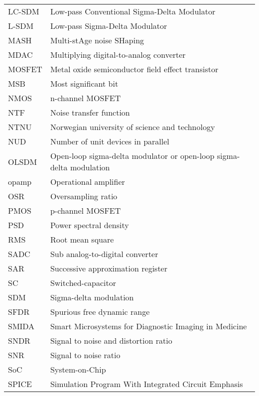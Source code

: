 \begin{tabular}{l l}
LC-SDM & Low-pass Conventional Sigma-Delta Modulator\\
L-SDM & Low-pass  Sigma-Delta Modulator\\
MASH & Multi-stAge noise SHaping\\
MDAC & Multiplying digital-to-analog converter\\
MOSFET & Metal oxide semiconductor field effect transistor\\
MSB & Most significant bit\\
NMOS & n-channel MOSFET\\
NTF & Noise transfer function\\
NTNU & Norwegian university of science and technology\\
NUD & Number of unit devices in parallel\\
OLSDM & Open-loop sigma-delta modulator or open-loop sigma-delta modulation \\
opamp & Operational amplifier\\
OSR & Oversampling ratio\\
PMOS & p-channel MOSFET\\
PSD & Power spectral density\\
RMS & Root mean square\\
SADC & Sub analog-to-digital converter\\
SAR & Successive approximation register\\
SC & Switched-capacitor\\
SDM & Sigma-delta modulation\\
SFDR & Spurious free dynamic range\\
SMIDA & Smart Microsystems for Diagnostic Imaging in Medicine \\
SNDR & Signal to noise and distortion ratio\\
SNR & Signal to noise ratio\\
SoC & System-on-Chip\\
SPICE & Simulation Program With Integrated Circuit Emphasis\\
\end{tabular} 

